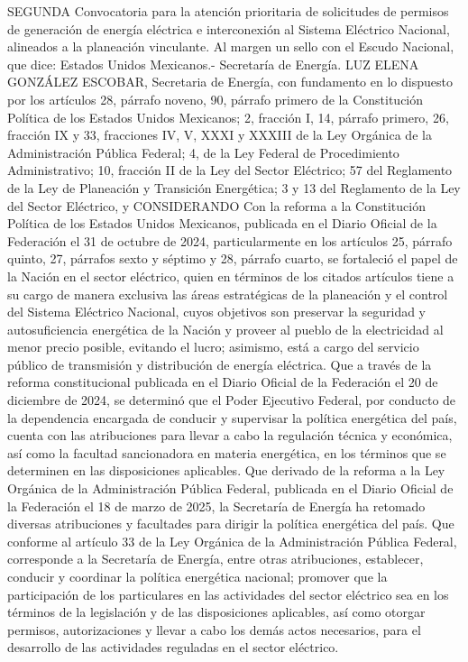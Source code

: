 \begingroup
\senertexto
SEGUNDA Convocatoria para la atención prioritaria de solicitudes de permisos de generación de energía eléctrica e interconexión al Sistema Eléctrico Nacional, alineados a la planeación vinculante.
Al margen un sello con el Escudo Nacional, que dice: Estados Unidos Mexicanos.- Secretaría de Energía.
LUZ ELENA GONZÁLEZ ESCOBAR, Secretaria de Energía, con fundamento en lo dispuesto por los artículos 28, párrafo noveno, 90, párrafo primero de la Constitución Política de los Estados Unidos Mexicanos; 2, fracción I, 14, párrafo primero, 26, fracción IX y 33, fracciones IV, V, XXXI y XXXIII de la Ley Orgánica de la Administración Pública Federal; 4, de la Ley Federal de Procedimiento Administrativo; 10, fracción II de la Ley del Sector Eléctrico; 57 del Reglamento de la Ley de Planeación y Transición Energética; 3 y 13 del Reglamento de la Ley del Sector Eléctrico, y
CONSIDERANDO
Con la reforma a la Constitución Política de los Estados Unidos Mexicanos, publicada en el Diario Oficial de la Federación el 31 de octubre de 2024, particularmente en los artículos 25, párrafo quinto, 27, párrafos sexto y séptimo y 28, párrafo cuarto, se fortaleció el papel de la Nación en el sector eléctrico, quien en términos de los citados artículos tiene a su cargo de manera exclusiva las áreas estratégicas de la planeación y el control del Sistema Eléctrico Nacional, cuyos objetivos son preservar la seguridad y autosuficiencia energética de la Nación y proveer al pueblo de la electricidad al menor precio posible, evitando el lucro; asimismo, está a cargo del servicio público de transmisión y distribución de energía eléctrica.
Que a través de la reforma constitucional publicada en el Diario Oficial de la Federación el 20 de diciembre de 2024, se determinó que el Poder Ejecutivo Federal, por conducto de la dependencia encargada de conducir y supervisar la política energética del país, cuenta con las atribuciones para llevar a cabo la regulación técnica y económica, así como la facultad sancionadora en materia energética, en los términos que se determinen en las disposiciones aplicables.
Que derivado de la reforma a la Ley Orgánica de la Administración Pública Federal, publicada en el Diario Oficial de la Federación el 18 de marzo de 2025, la Secretaría de Energía ha retomado diversas atribuciones y facultades para dirigir la política energética del país.
Que conforme al artículo 33 de la Ley Orgánica de la Administración Pública Federal, corresponde a la Secretaría de Energía, entre otras atribuciones, establecer, conducir y coordinar la política energética nacional; promover que la participación de los particulares en las actividades del sector eléctrico sea en los términos de la legislación y de las disposiciones aplicables, así como otorgar permisos, autorizaciones y llevar a cabo los demás actos necesarios, para el desarrollo de las actividades reguladas en el sector eléctrico.
